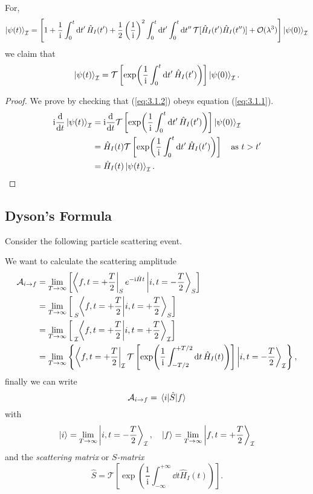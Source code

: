 \documentclass[a4paper,11pt]{article}
\begin{document}
	\begin{clm}
		For,
	\[
		\ket{\psi(t)}_{\mathcal{I}} = \left[ 1 + \frac{1}{\mathrm{i}} \int_{0}^{t} \dd{t'} \hat H_I (t') + \frac{1}{2} \left( \frac{1}{\mathrm{i}} \right)^2 \int_{0}^{t} \dd{t'} \int_{0}^{t} \dd{t''} \mathcal{T}[\hat H_I(t') \hat H_I(t'')] + \mathcal{O}(\lambda^3) \right] \ket{\psi(0)}_{\mathcal{I}}
	\]
	we claim that 
	\begin{equation}
		\ket{\psi(t)}_{\mathcal{I}} = \mathcal{T}\left[ \exp(\frac{1}{\mathrm{i}}\int_{0}^{t}\dd{t'}\hat H_I(t')) \right] \ket{\psi(0)}_{\mathcal{I}}.
		\label{eq:3.1.2}
	\end{equation}
	\end{clm}
	\begin{proof}
		We prove by checking that (\ref{eq:3.1.2}) obeys equation (\ref{eq:3.1.1}).
		\begin{align*}
			\mathrm{i} \dv{t}\ket{\psi(t)}_{\mathcal{I}} & = \mathrm{i} \dv{t} \mathcal{T}\left[ \exp(\frac{1}{\mathrm{i}}\int_{0}^{t}\dd{t'}\hat H_I(t')) \right] \ket{\psi(0)}_{\mathcal{I}}\\
			& = \hat H_I (t) \mathcal{T}\left[ \exp(\frac{1}{\mathrm{i}} \int_{0}^{t}\dd{t'} \hat H_I (t')) \right] \quad \text{as }t>t'\\
			& = \hat H_I(t) \ket{\psi(t)}_{\mathcal{I}}. \qedhere
		\end{align*}
	\end{proof}
	
	\subsection{Dyson's Formula}

	Consider the following particle scattering event.
	
	
	We want to calculate the scattering amplitude
	\begin{align*}
		\mathcal{A}_{i \to f} & = \lim _{T \to \infty} \left[\bra{f, t = + \frac{T}{2}}_S e ^{-\mathrm{i}\hat H t} \ket{i, t = - \frac{T}{2}}_S \right]\\
		& = \lim _{T \to \infty} \left[\tensor[_S]{\braket{f, t = + \frac{T}{2}}{i, t = + \frac{T}{2}}}{_S}\right]\\
		& = \lim _{T \to \infty} \left[\tensor[_{\mathcal{I}}]{\braket{f, t = + \frac{T}{2}}{i, t = + \frac{T}{2}}}{_{\mathcal{I}}}\right]\\
		& = \lim _{T \to \infty} \left\{ \bra{f, t = + \frac{T}{2}}_{\mathcal{I}} \mathcal{T}\left[ \exp(\frac{1}{\mathrm{i}}\int_{- T/2}^{+T/2} \dd{t}\hat H_I(t)) \right] \ket{i, t = - \frac{T}{2}}_{\mathcal{I}} \right\},
	\end{align*}
	finally we can write
	\[
		\mathcal{A}_{i \to f} = \mel{i}{\hat S}{f}
	\]
	with
	\[
		\ket{i} = \lim _{T \to \infty} \ket{i, t = - \frac{T}{2}}_{\mathcal{I}}, \quad \ket{f} = \lim _{T \to \infty} \ket{f, t = + \frac{T}{2}}_{\mathcal{I}}
	\]
	and the \emph{scattering matrix} or \emph{$S$-matrix}
	\[
		\hat S = \mathcal{T} \left[ \exp(\frac{1}{\mathrm{i}}\int_{-\infty}^{+\infty}\dd{t}\hat H_I(t)) \right].
	\]
	 
\end{document}
